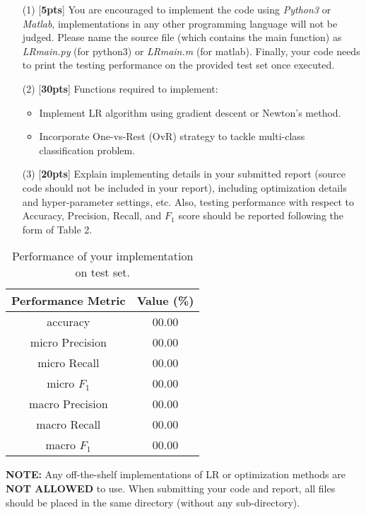 \documentclass{article}
\begin{document}
\begin{enumerate}
    \item[(1)] [\textbf{5pts}] You are encouraged to implement the code using \emph{Python3} or \emph{Matlab}, implementations in any other programming language will not be judged. Please name the source file (which contains the main function) as \emph{LR\underline{\hspace{0.5em}}main.py} (for python3) or \emph{LR\underline{\hspace{0.5em}}main.m} (for matlab). Finally, your code needs to print the testing performance on the provided test set once executed.

    \item[(2)] [\textbf{30pts}] Functions required to implement:
    \begin{itemize}
        \item Implement LR algorithm using gradient descent or Newton's method.
        \item Incorporate One-vs-Rest (OvR) strategy to tackle multi-class classification problem.
    \end{itemize}
    \item[(3)] [\textbf{20pts}] Explain implementing details in your submitted report (source code should not be included in your report), including optimization details and hyper-parameter settings, etc. Also, testing performance with respect to Accuracy, Precision, Recall, and $F_1$ score should be reported following the form of Table 2.
\end{enumerate}

\begin{table}[h]
    \centering
     \caption{Performance of your implementation on test set.}
     \vspace{2mm}
    \label{tab:my_label}
    \begin{tabular}{|c|c|}
       \hline
       Performance Metric & Value (\%) \\
       \hline
       accuracy & 00.00 \\
       \hline
       micro Precision  & 00.00\\
       \hline
       micro Recall & 00.00\\
       \hline
       micro $F_1$ & 00.00\\
       \hline
       macro Precision  & 00.00\\
       \hline
       macro Recall & 00.00\\
       \hline
       macro $F_1$ & 00.00\\
       \hline
    \end{tabular}

\end{table}

\textbf{NOTE:} Any off-the-shelf implementations of LR or optimization methods are \textbf{NOT ALLOWED} to use. When submitting your code and report, all files should be placed in the same directory (without any sub-directory).
\end{document}
